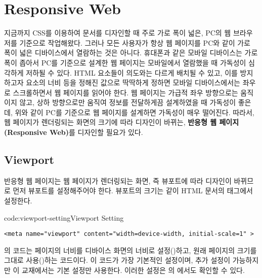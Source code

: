\section{Responsive Web} \label{sect:responsive-web}

지금까지 CSS를 이용하여 문서를 디자인할 때 주로 가로 폭이 넓은, PC의 웹 브라우저를 기준으로 작업해왔다. 그러나 모든 사용자가 항상 웹 페이지를 PC와 같이 가로 폭이 넓은 디바이스에서 열람하는 것은 아니다. 휴대폰과 같은 모바일 디바이스는 가로 폭이 좁아서 PC를 기준으로 설계한 웹 페이지는 모바일에서 열람했을 때 가독성이 심각하게 저하될 수 있다. HTML 요소들이 의도와는 다르게 배치될 수 있고, 이를 방지하고자 요소의 너비 등을 정해진 값으로 딱딱하게 정하면 모바일 디바이스에서는 좌우로 스크롤하면서 웹 페이지를 읽어야 한다. 웹 페이지는 가급적 좌우 방향으로는 움직이지 않고, 상하 방향으로만 움직여 정보를 전달하게끔 설계하였을 때 가독성이 좋은데, 위와 같이 PC를 기준으로 웹 페이지를 설계하면 가독성이 매우 떨어진다. 따라서, 웹 페이지가 렌더링되는 화면의 크기에 따라 디자인이 바뀌는, \textbf{반응형 웹 페이지(Responsive Web)}를 디자인할 필요가 있다.


\subsection*{Viewport}
반응형 웹 페이지는 웹 페이지가 렌더링되는 화면, 즉 뷰포트에 따라 디자인이 바뀌므로 먼저 뷰포트를 설정해주어야 한다. 뷰포트의 크기는 \과 같이 HTML 문서의  태그에서 설정한다.

\begin{codeenv}{code:viewport-setting}{Viewport Setting}\begin{verbatim}
<meta name="viewport" content="width=device-width, initial-scale=1" >
\end{verbatim}
\end{codeenv}

의 코드는 페이지의 너비를 디바이스 화면의 너비로 설정()하고, 원래 페이지의 크기를 그대로 사용()하는 코드이다. 이 코드가 가장 기본적인 설정이며, 추가 설정이 가능하지만 이 교재에서는 기본 설정만 사용한다. 이러한 설정은 의 에서도 확인할 수 있다.

